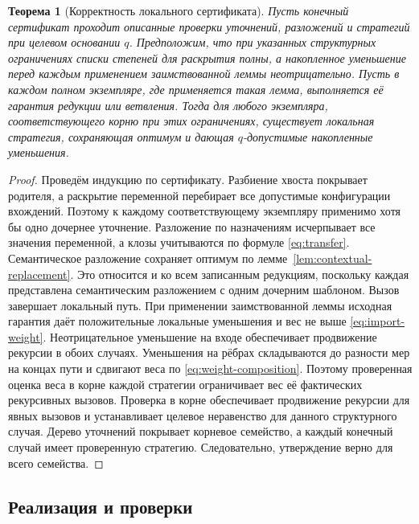 \documentclass[10pt,twoside]{article}
\newtheorem{theorem}{Теорема}
\theoremstyle{definition}
\theoremstyle{remark}
\begin{document}
\begin{theorem}[Корректность локального сертификата]
\label{thm:local-soundness}
Пусть конечный сертификат проходит описанные проверки уточнений,
разложений и стратегий при целевом основании $q$. Предположим, что при
указанных структурных ограничениях списки степеней для раскрытия полны,
а накопленное уменьшение перед каждым применением заимствованной леммы
неотрицательно. Пусть в каждом полном экземпляре, где применяется такая
лемма, выполняется её гарантия редукции или ветвления. Тогда для любого
экземпляра, соответствующего корню при этих ограничениях, существует
локальная стратегия, сохраняющая оптимум и дающая $q$-допустимые
накопленные уменьшения.
\end{theorem}
\begin{proof}
Проведём индукцию по сертификату. Разбиение хвоста покрывает родителя,
а раскрытие переменной перебирает все допустимые конфигурации вхождений.
Поэтому к каждому соответствующему экземпляру применимо хотя бы одно
дочернее уточнение. Разложение по назначениям исчерпывает все значения
переменной, а клозы учитываются по формуле \eqref{eq:transfer}.
Семантическое разложение сохраняет оптимум по
лемме~\ref{lem:contextual-replacement}. Это относится и ко всем
записанным редукциям, поскольку каждая представлена семантическим
разложением с одним дочерним шаблоном. Вызов завершает локальный путь.
При применении заимствованной леммы исходная гарантия даёт положительные
локальные уменьшения и вес не выше \eqref{eq:import-weight}.
Неотрицательное уменьшение на входе обеспечивает продвижение рекурсии
в обоих случаях. Уменьшения на рёбрах складываются до разности мер
на концах пути и сдвигают веса по \eqref{eq:weight-composition}.
Поэтому проверенная оценка веса в корне каждой стратегии ограничивает
вес её фактических рекурсивных вызовов. Проверка в корне обеспечивает
продвижение рекурсии для явных вызовов и устанавливает целевое
неравенство для данного структурного случая. Дерево уточнений покрывает
корневое семейство, а каждый конечный случай имеет проверенную
стратегию. Следовательно, утверждение верно для всего семейства.
\end{proof}

\subsection{Реализация и проверки}
\end{document}
